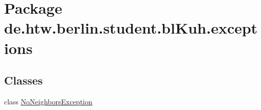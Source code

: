 \hypertarget{namespacede_1_1htw_1_1berlin_1_1student_1_1bl_kuh_1_1exceptions}{\section{Package de.\-htw.\-berlin.\-student.\-bl\-Kuh.\-exceptions}
\label{namespacede_1_1htw_1_1berlin_1_1student_1_1bl_kuh_1_1exceptions}
}
\subsection*{Classes}
\begin{DoxyCompactItemize}
\item 
class \hyperlink{classde_1_1htw_1_1berlin_1_1student_1_1bl_kuh_1_1exceptions_1_1_no_neighbors_exception}{No\-Neighbors\-Exception}
\end{DoxyCompactItemize}
